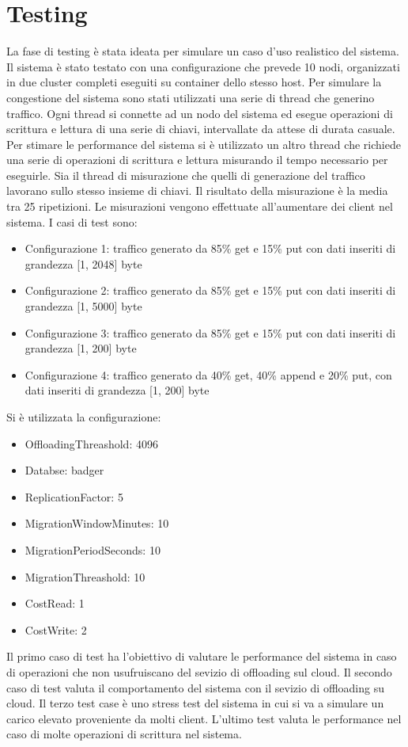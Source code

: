 \documentclass[conference]{IEEEtran}
\begin{document}
\section{Testing}
La fase di testing è stata ideata per simulare un caso d'uso realistico del sistema. Il sistema è stato testato con una
configurazione che prevede 10 nodi, organizzati in due cluster completi eseguiti su container dello stesso host. Per simulare la congestione del sistema sono stati
utilizzati una serie di thread che generino traffico. Ogni thread si connette ad un nodo del sistema
ed esegue operazioni di scrittura e lettura di una serie di chiavi, intervallate da attese di durata casuale. Per stimare le performance del sistema si
è utilizzato un altro thread che richiede una serie di operazioni di scrittura e lettura misurando il tempo necessario per
eseguirle. Sia il thread di misurazione che quelli di generazione del traffico lavorano sullo stesso insieme di chiavi.
Il risultato della misurazione è la media tra 25 ripetizioni.
Le misurazioni vengono effettuate all'aumentare dei client nel sistema. I casi di test sono:
\begin{itemize}
  \item Configurazione 1: traffico generato da 85\% get e 15\% put con dati inseriti di grandezza [1, 2048] byte
  \item Configurazione 2: traffico generato da 85\% get e 15\% put con dati inseriti di grandezza [1, 5000] byte
  \item Configurazione 3: traffico generato da 85\% get e 15\% put con dati inseriti di grandezza [1, 200] byte
  \item Configurazione 4: traffico generato da 40\% get, 40\% append e 20\% put, con dati inseriti di grandezza [1, 200] byte
\end{itemize}
Si è utilizzata la configurazione:
\begin{itemize}
  \item OffloadingThreashold: 4096
  \item Databse: badger
  \item ReplicationFactor: 5
  \item MigrationWindowMinutes: 10
  \item MigrationPeriodSeconds: 10
  \item MigrationThreashold: 10
  \item CostRead: 1
  \item CostWrite: 2
\end{itemize}

Il primo caso di test ha l'obiettivo di valutare le performance del sistema in caso di operazioni che non usufruiscano del
sevizio di offloading sul cloud. Il secondo caso di test valuta il comportamento del sistema con il sevizio di offloading su cloud.
Il terzo test case è uno stress test del sistema in cui si va a simulare un carico elevato proveniente da molti client.
L'ultimo test valuta le performance nel caso di molte operazioni di scrittura nel sistema.
\end{document}
